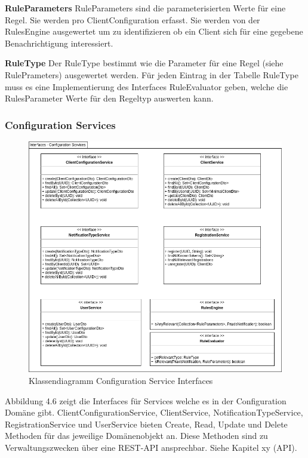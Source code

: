 \textbf{RuleParameters}
RuleParameters sind die parameterisierten Werte für eine Regel.
Sie werden pro ClientConfiguration erfasst.
Sie werden von der RulesEngine ausgewertet um zu identifizieren ob ein Client sich für eine gegebene Benachrichtigung interessiert.

\textbf{RuleType}
Der RuleType bestimmt wie die Parameter für eine Regel (siehe RulePrameters) ausgewertet werden.
Für jeden Eintrag in der Tabelle RuleType muss es eine Implementierung des Interfaces RuleEvaluator geben, welche die RulesParameter Werte für den Regeltyp auswerten kann.

\subsubsection*{Configuration Services}

\begin{figure}[h]
    \centering
    \begin{minipage}[b]{1.0\textwidth}
        \includegraphics[width=\textwidth]{graphics/Class_Configuration_Services}
        \caption{Klassendiagramm Configuration Service Interfaces}
    \end{minipage}
\end{figure}

Abbildung 4.6 zeigt die Interfaces für Services welche es in der Configuration Domäne gibt.
ClientConfigurationService, ClientService, NotificationTypeService, RegistrationService und UserService bieten Create, Read, Update und Delete Methoden für das jeweilige Domänenobjekt an.
Diese Methoden sind zu Verwaltungszwecken über eine REST-API ansprechbar. Siehe Kapitel xy (API).

